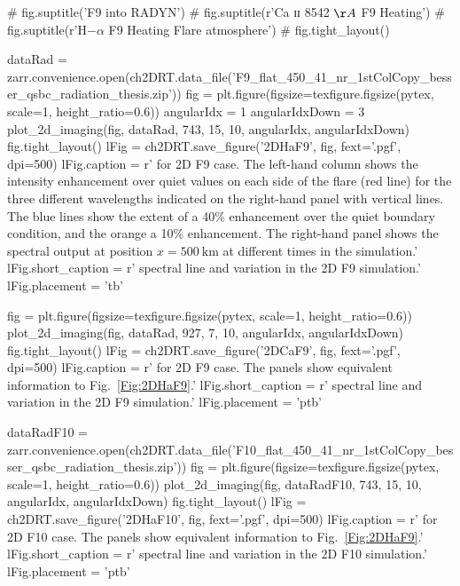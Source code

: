 \begin{pycode}[2DRT]
#         fig.suptitle('F9 into RADYN')
#         fig.suptitle(r'Ca ɪɪ 8542 $\AA$ F9 Heating')
    # fig.suptitle(r'H$-\alpha$ F9 Heating Flare atmosphere')
    # fig.tight_layout()

dataRad = zarr.convenience.open(ch2DRT.data_file('F9_flat_450_41_nr_1stColCopy_besser_qsbc_radiation_thesis.zip'))
fig = plt.figure(figsize=texfigure.figsize(pytex, scale=1, height_ratio=0.6))
angularIdx = 1
angularIdxDown = 3
plot_2d_imaging(fig, dataRad, 743, 15, 10, angularIdx, angularIdxDown)
fig.tight_layout()
lFig = ch2DRT.save_figure('2DHaF9', fig, fext='.pgf', dpi=500)
lFig.caption = r'\Ha{} for 2D F9 case. The left-hand column shows the intensity enhancement over quiet values on each side of the flare (red line) for the three different wavelengths indicated on the right-hand panel with vertical lines. The blue lines show the extent of a 40\% enhancement over the quiet boundary condition, and the orange a 10\% enhancement. The right-hand panel shows the spectral output at position $x=\SI{500}{\kilo\metre}$ at different times in the simulation.'
lFig.short_caption = r'\Ha{} spectral line and variation in the 2D F9 simulation.'
lFig.placement = 'tb'
\end{pycode}

\begin{pycode}[2DRT]
fig = plt.figure(figsize=texfigure.figsize(pytex, scale=1, height_ratio=0.6))
plot_2d_imaging(fig, dataRad, 927, 7, 10, angularIdx, angularIdxDown)
fig.tight_layout()
lFig = ch2DRT.save_figure('2DCaF9', fig, fext='.pgf', dpi=500)
lFig.caption = r'\CaLine{} for 2D F9 case. The panels show equivalent information to Fig.~\ref{Fig:2DHaF9}.'
lFig.short_caption = r'\CaLine{} spectral line and variation in the 2D F9 simulation.'
lFig.placement = 'ptb'
\end{pycode}

\begin{pycode}[2DRT]
dataRadF10 = zarr.convenience.open(ch2DRT.data_file('F10_flat_450_41_nr_1stColCopy_besser_qsbc_radiation_thesis.zip'))
fig = plt.figure(figsize=texfigure.figsize(pytex, scale=1, height_ratio=0.6))
plot_2d_imaging(fig, dataRadF10, 743, 15, 10, angularIdx, angularIdxDown)
fig.tight_layout()
lFig = ch2DRT.save_figure('2DHaF10', fig, fext='.pgf', dpi=500)
lFig.caption = r'\Ha{} for 2D F10 case. The panels show equivalent information to Fig.~\ref{Fig:2DHaF9}.'
lFig.short_caption = r'\Ha{} spectral line and variation in the 2D F10 simulation.'
lFig.placement = 'ptb'
\end{pycode}


